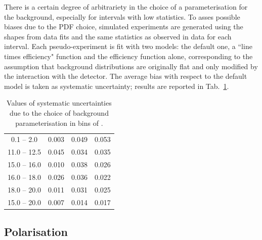 There is a certain degree of arbitrariety in the choice of a parameterisation for the background,
especially for \qsq intervals with low statistics. To asses possible biases due to the PDF choice, simulated experiments
are generated using the shapes from data fits and the same statistics as observed in data for each \qsq interval.
Each pseudo-experiment is fit with two models: the default one, a ``line times efficiency" function and
the efficiency function alone, corresponding to the assumption that background distributions
are originally flat and only modified by the interaction with the detector. 
The average bias with respect to the default model is taken as systematic uncertainty;
results are reported in Tab.~\ref{tab:bkgParamSys}.
%
%
\begin{center}
\begin{table}[h]
\centering
\caption{ Values of systematic uncertainties due to the choice of background parameterisation in bins of \qsq. }
\begin{tabular}{c|ccc}
 \boldmath{ \qsq [\gevgevcccc] } &  \boldmath{ $\afbl$ }     &  \boldmath{  $\fl$ }      &  \boldmath{ $\afbh$   } \\ \hline
\phantom{x}0.1 -- 2.0\phantom{x}         &  0.003	 &   0.049	  &  0.053		\\
11.0 -- 12.5		&  0.045     &   0.034	  &  0.035     \\
15.0 -- 16.0 	&  0.010     &   0.038    &  0.026     \\
16.0 -- 18.0 	&  0.026     &   0.036    &  0.022     \\
18.0 -- 20.0 	&  0.011     &   0.031    &  0.025     \\
\hline
15.0 -- 20.0		&  0.007     &   0.014    &  0.017     \\
\end{tabular}
\label{tab:bkgParamSys}
\end{table}
\end{center}




\subsection{Polarisation}
\label{sec:ang_pol_sys}

